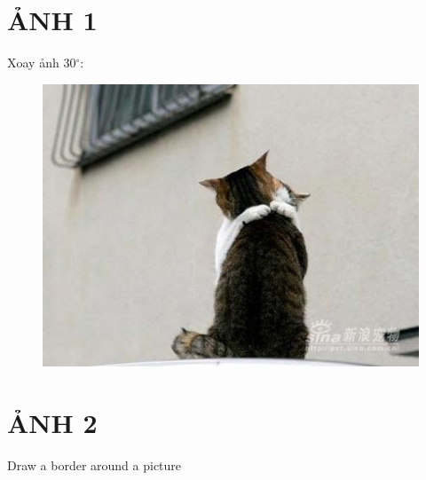 \documentclass{article}
\begin{document}
\section{ẢNH 1}
Xoay ảnh 30$^\circ$:
\begin{figure}[h] %
\includegraphics[angle=30, scale=0.3]{meo}
\end{figure}

\section{ẢNH 2}
Draw a border around a picture
\begin{figure}[h]
\setlength\fboxsep{5pt} %
\setlength\fboxrule{0.5pt} %
\end{figure}
\end{document}
